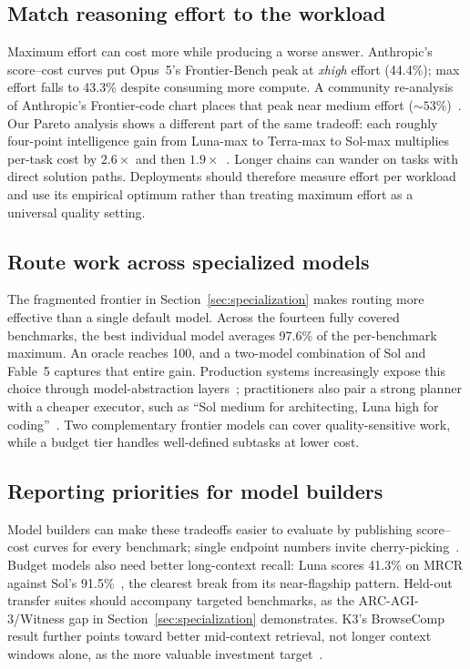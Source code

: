 \subsection{Match reasoning effort to the workload}\label{sec:effort}

Maximum effort can cost more while producing a worse answer. Anthropic's
score--cost curves put Opus~5's Frontier-Bench peak at \emph{xhigh} effort
(44.4\%); max effort falls to 43.3\% despite consuming more compute. A
community re-analysis of Anthropic's Frontier-code chart places that peak near
medium effort (${\sim}53\%$)~\cite{anthropic2026opus5}. Our Pareto analysis
shows a different part of the same tradeoff: each roughly four-point
intelligence gain from Luna-max to Terra-max to Sol-max multiplies per-task
cost by $2.6\times$ and then $1.9\times$~\cite{gist2026aa56}. Longer chains
can wander on tasks with direct solution paths. Deployments should therefore
measure effort per workload and use its empirical optimum rather than treating
maximum effort as a universal quality setting.

\subsection{Route work across specialized models}\label{sec:routing}

The fragmented frontier in Section~\ref{sec:specialization} makes routing more
effective than a single default model. Across the fourteen fully covered
benchmarks, the best individual model averages 97.6\% of the per-benchmark
maximum. An oracle reaches 100, and a two-model combination of Sol and Fable~5
captures that entire gain. Production systems increasingly expose this choice
through model-abstraction layers~\cite{explainx2026gpt56}; practitioners also
pair a strong planner with a cheaper executor, such as ``Sol medium for
architecting, Luna high for coding''~\cite{hn2026gpt56}. Two complementary
frontier models can cover quality-sensitive work, while a budget tier handles
well-defined subtasks at lower cost.

\subsection{Reporting priorities for model builders}\label{sec:labs}
Model builders can make these tradeoffs easier to evaluate by publishing
score--cost curves for every benchmark; single endpoint numbers invite
cherry-picking~\cite{anthropic2026opus5}. Budget models also need better
long-context recall: Luna scores 41.3\% on MRCR against Sol's
91.5\%~\cite{openai2026gpt56}, the clearest break from its near-flagship
pattern. Held-out transfer suites should accompany targeted benchmarks, as the
ARC-AGI-3/Witness gap in Section~\ref{sec:specialization} demonstrates.
K3's BrowseComp result further points toward better mid-context retrieval, not
longer context windows alone, as the more valuable investment
target~\cite{moonshot2026k3}.
